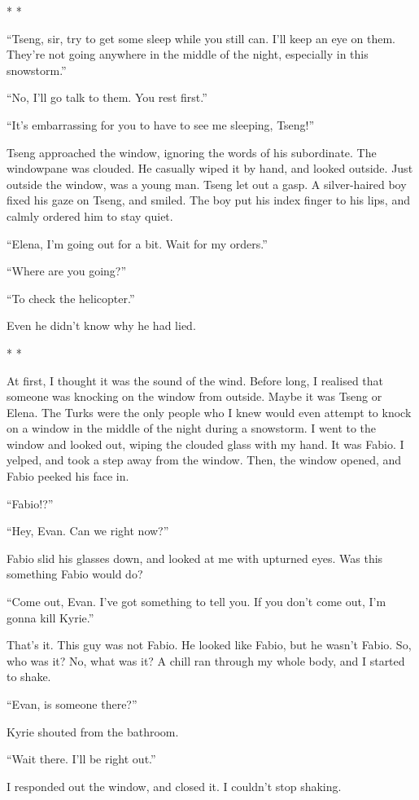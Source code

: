 \documentclass[oneside]{book}
\begin{document}
* *

“Tseng, sir, try to get some sleep while you still can. I’ll keep an eye on them. They’re not going anywhere in the middle of the night, especially in this snowstorm.”

“No, I’ll go talk to them. You rest first.”

“It’s embarrassing for you to have to see me sleeping, Tseng!”

Tseng approached the window, ignoring the words of his subordinate. The windowpane was clouded. He casually wiped it by hand, and looked outside. Just outside the window, was a young man. Tseng let out a gasp. A silver-haired boy fixed his gaze on Tseng, and smiled. The boy put his index finger to his lips, and calmly ordered him to stay quiet.

“Elena, I’m going out for a bit. Wait for my orders.”

“Where are you going?”

“To check the helicopter.”

Even he didn’t know why he had lied.

* *

At first, I thought it was the sound of the wind. Before long, I realised that someone was knocking on the window from outside. Maybe it was Tseng or Elena. The Turks were the only people who I knew would even attempt to knock on a window in the middle of the night during a snowstorm. I went to the window and looked out, wiping the clouded glass with my hand. It was Fabio. I yelped, and took a step away from the window. Then, the window opened, and Fabio peeked his face in.

“Fabio!?”

“Hey, Evan. Can we right now?”

Fabio slid his glasses down, and looked at me with upturned eyes. Was this something Fabio would do?

“Come out, Evan. I’ve got something to tell you. If you don’t come out, I’m gonna kill Kyrie.”

That’s it. This guy was not Fabio. He looked like Fabio, but he wasn’t Fabio. So, who was it? No, what was it? A chill ran through my whole body, and I started to shake.

“Evan, is someone there?”

Kyrie shouted from the bathroom.

“Wait there. I’ll be right out.”

I responded out the window, and closed it. I couldn’t stop shaking.
\end{document}
